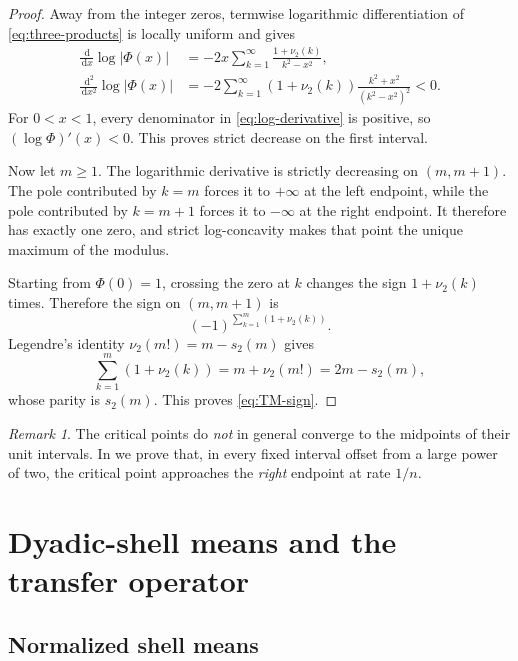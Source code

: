 \documentclass[11pt,oneside]{article}
\theoremstyle{definition}
\theoremstyle{remark}
\newtheorem{remark}[remark]{Remark}
\newcommand{\dd}{\,\mathrm d}
\newcommand{\Phiup}{\Phi}
\newcommand{\vtwo}{\nu_2}
\newcommand{\abs}[1]{\left|#1\right|}
\begin{document}
\begin{proof}
Away from the integer zeros, termwise logarithmic differentiation of
\eqref{eq:three-products} is locally uniform and gives
\begin{align}
 \frac{\dd}{\dd x}\log\abs{\Phiup(x)}
 &=-2x\sum_{k=1}^{\infty}\frac{1+\vtwo(k)}{k^2-x^2},
 \label{eq:log-derivative}\\
 \frac{\dd^2}{\dd x^2}\log\abs{\Phiup(x)}
 &=-2\sum_{k=1}^{\infty}(1+\vtwo(k))
   \frac{k^2+x^2}{(k^2-x^2)^2}<0.
 \label{eq:strict-log-concavity}
\end{align}
For $0<x<1$, every denominator in \eqref{eq:log-derivative} is positive, so
$(\log\Phiup)'(x)<0$.  This proves strict decrease on the first interval.

Now let $m\ge1$.  The logarithmic derivative is strictly decreasing on $(m,m+1)$.
The pole contributed by $k=m$ forces it to $+\infty$ at the left endpoint, while the pole
contributed by $k=m+1$ forces it to $-\infty$ at the right endpoint.  It therefore has
exactly one zero, and strict log-concavity makes that point the unique maximum of the modulus.

Starting from $\Phiup(0)=1$, crossing the zero at $k$ changes the sign
$1+\vtwo(k)$ times.  Therefore the sign on $(m,m+1)$ is
\[
 (-1)^{\sum_{k=1}^{m}(1+\vtwo(k))}.
\]
Legendre's identity $\vtwo(m!)=m-s_2(m)$ gives
\[
 \sum_{k=1}^{m}(1+\vtwo(k))=m+\vtwo(m!)=2m-s_2(m),
\]
whose parity is $s_2(m)$.  This proves \eqref{eq:TM-sign}.
\end{proof}

\begin{remark}
The critical points do \emph{not} in general converge to the midpoints of their unit
intervals.  In  we prove that, in every fixed interval offset
from a large power of two, the critical point approaches the \emph{right} endpoint at rate
$1/n$.
\end{remark}

\section{Dyadic-shell means and the transfer operator}
\label{sec:Lq-spectrum}

\subsection{Normalized shell means}
\end{document}
